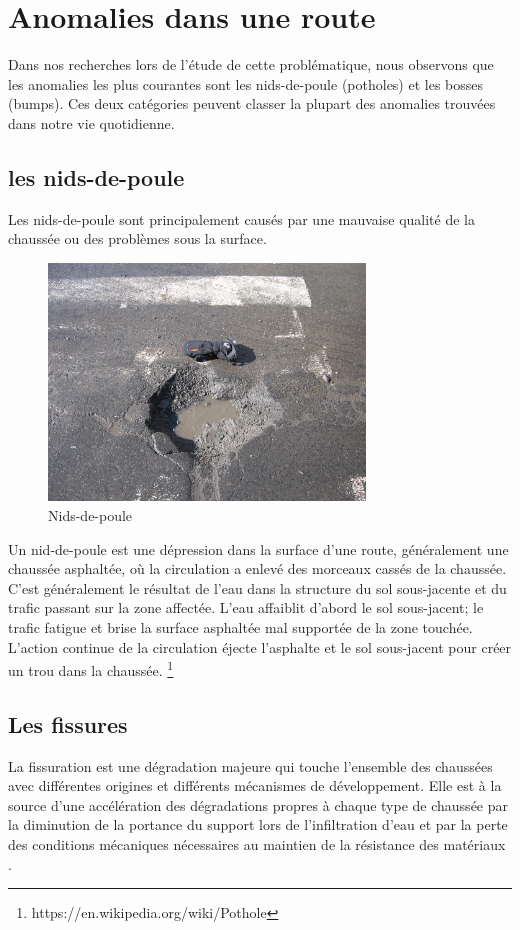 \section{Anomalies dans une route}
Dans nos recherches lors de l'étude de cette problématique, nous observons que les anomalies
les plus courantes sont les nids-de-poule (potholes) et les bosses (bumps).
Ces deux catégories peuvent classer la plupart des anomalies trouvées dans notre vie quotidienne.

\subsection{les nids-de-poule}

Les nids-de-poule sont principalement causés par une mauvaise qualité de la chaussée ou des problèmes sous la surface.

\begin{figure}[h!]
  \center
  \includegraphics[width=0.75\textwidth]{Images/chapter1/Pothole.jpg}
  \caption{Nids-de-poule}
\end{figure}

Un nid-de-poule est une dépression dans la surface d'une route, généralement une chaussée asphaltée, où la circulation
a enlevé des morceaux cassés de la chaussée.
C'est généralement le résultat de l'eau dans la structure du sol sous-jacente et du trafic passant sur la zone affectée.
L'eau affaiblit d'abord le sol sous-jacent; le trafic fatigue et brise la surface asphaltée mal supportée de la zone touchée.
L'action continue de la circulation éjecte l'asphalte et le sol sous-jacent pour créer un trou dans la chaussée.
\footnote{https://en.wikipedia.org/wiki/Pothole}

\subsection{Les fissures}
La fissuration est une dégradation majeure qui touche l'ensemble des chaussées avec différentes origines et différents mécanismes de développement. Elle est à la source d'une accélération des dégradations propres à chaque type de chaussée par la diminution de la portance du support lors de l'infiltration d'eau et par la perte des conditions mécaniques nécessaires au maintien de la résistance des matériaux \cite{FissurationOrnierageProblematiques}.


